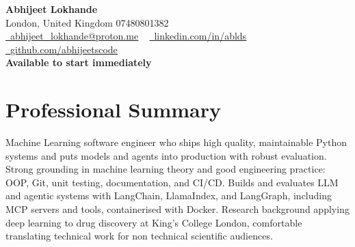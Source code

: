 \documentclass[a4paper,10pt]{article}
\begin{document}
    \begin{center}
        {\Huge\bfseries Abhijeet Lokhande}
        \\[2pt] {\color{muted}London, United Kingdom \textbar{} 07480801382}\\
        \small
        \href{mailto:abhijeet_lokhande@proton.me}{\raisebox{-0.2\height}{\color{primary}\faEnvelope}\  \underline{abhijeet\_lokhande@proton.me}} ~
        \href{https://www.linkedin.com/in/ablds/}{\raisebox{-0.2\height}{\color{primary}\faLinkedin}\ \underline{linkedin.com/in/ablds}}  ~
        \href{https://github.com/abhijeetscode}{\raisebox{-0.2\height}{\color{primary}\faGithub}\ \underline{github.com/abhijeetscode}}
        \\[4pt] {\color{accent}\textbf{Available to start immediately}}
    \end{center}

\section{Professional Summary}
\vspace{-5pt}
{\color{muted}Machine Learning software engineer who ships high quality, maintainable Python systems and puts models and agents into production with robust evaluation. Strong grounding in machine learning theory and good engineering practice: OOP, Git, unit testing, documentation, and CI/CD. Builds and evaluates LLM and agentic systems with LangChain, LlamaIndex, and LangGraph, including MCP servers and tools, containerised with Docker. Research background applying deep learning to drug discovery at King's College London, comfortable translating technical work for non technical scientific audiences.}
\vspace{2pt}

\end{document}
